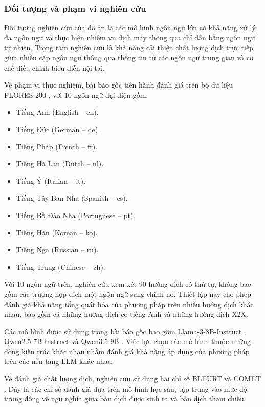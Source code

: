 \subsubsection{Đối tượng và phạm vi nghiên cứu}

Đối tượng nghiên cứu của đồ án là các mô hình ngôn ngữ lớn có khả năng xử lý đa ngôn ngữ và thực hiện nhiệm vụ dịch máy thông qua chỉ dẫn bằng ngôn ngữ tự nhiên. Trọng tâm nghiên cứu là khả năng cải thiện chất lượng dịch trực tiếp giữa nhiều cặp ngôn ngữ thông qua thông tin từ các ngôn ngữ trung gian và cơ chế điều chỉnh biểu diễn nội tại.

Về phạm vi thực nghiệm, bài báo gốc tiến hành đánh giá trên bộ dữ liệu FLORES-200 \cite{nllbteam2022languageleftbehindscaling}, với 10 ngôn ngữ đại diện gồm:

\begin{itemize}
    \item Tiếng Anh (English -- en).
    \item Tiếng Đức (German -- de).
    \item Tiếng Pháp (French -- fr).
    \item Tiếng Hà Lan (Dutch -- nl).
    \item Tiếng Ý (Italian -- it).
    \item Tiếng Tây Ban Nha (Spanish -- es).
    \item Tiếng Bồ Đào Nha (Portuguese -- pt).
    \item Tiếng Hàn (Korean -- ko).
    \item Tiếng Nga (Russian -- ru).
    \item Tiếng Trung (Chinese -- zh).
\end{itemize}

Với 10 ngôn ngữ trên, nghiên cứu xem xét 90 hướng dịch có thứ tự, không bao gồm các trường hợp dịch một ngôn ngữ sang chính nó. Thiết lập này cho phép đánh giá khả năng tổng quát hóa của phương pháp trên nhiều hướng dịch khác nhau, bao gồm cả những hướng dịch có tiếng Anh và những hướng dịch X2X.

Các mô hình được sử dụng trong bài báo gốc bao gồm Llama-3-8B-Instruct \cite{llama3modelcard}, Qwen2.5-7B-Instruct \cite{qwen2.5} và Qwen3.5-9B \cite{qwen3.5}. Việc lựa chọn các mô hình thuộc những dòng kiến trúc khác nhau nhằm đánh giá khả năng áp dụng của phương pháp trên các nền tảng LLM khác nhau.

Về đánh giá chất lượng dịch, nghiên cứu sử dụng hai chỉ số BLEURT \cite{sellam-etal-2020-bleurt} và COMET \cite{rei-etal-2022-comet}. Đây là các chỉ số đánh giá dựa trên mô hình học sâu, tập trung vào mức độ tương đồng về ngữ nghĩa giữa bản dịch được sinh ra và bản dịch tham chiếu.

